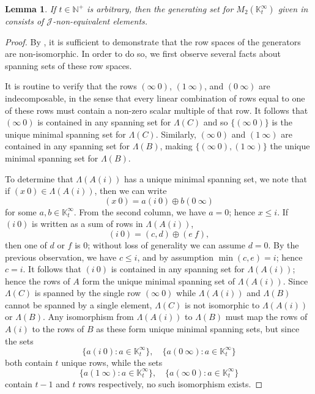 \documentclass[11pt]{article}
\newtheorem{lemma}[thm]{Lemma}
\numberwithin{equation}{section}
\newcommand{\set}[2]{\ensuremath{\{#1 : #2 \}}}
\newcommand{\J}{\mathscr{J}}
\newcommand{\N}{\mathbb{N}}
\newcommand{\Np}{\N^{+}}
\newcommand{\K}{\mathbb{K}}
\newcommand{\Kmint}{\K^{\infty}_t}
\newcommand{\COMMA}{,\quad}
\newcommand{\RowS}{\Lambda}
\begin{document}
\begin{lemma}
  If $t \in \Np$ is arbitrary, then the generating set for $M_2(\Kmint)$ given
  in  consists of
  $\J$-non-equivalent elements.
\end{lemma}
\begin{proof}
  By , it is sufficient to
  demonstrate that the row spaces of the generators are non-isomorphic. In order
  to do so, we first observe several facts about spanning sets of these row
  spaces.

  It is routine to verify that the rows $(\infty~0)$, $(1~\infty)$, and
  $(0~\infty)$ are indecomposable, in the sense that every linear combination of
  rows equal to one of these rows must contain a non-zero scalar multiple of
  that row. It follows that $(\infty~0)$ is contained in any spanning set for
  $\RowS(C)$ and so $\{(\infty~0)\}$ is the unique minimal spanning set for
  $\RowS(C)$.  Similarly, $(\infty~0)$ and $(1~\infty)$ are contained in any
  spanning set for $\RowS(B)$, making $\{(\infty~0), (1~\infty)\}$ the unique
  minimal spanning set for $\RowS(B)$.

  To determine that $\RowS(A(i))$ has a unique minimal spanning set, we note
  that if $(x~0) \in \RowS(A(i))$, then we can write \[(x~0) = a(i~0) \oplus
    b(0~\infty) \] for some $a, b \in \Kmint$. From the second column, we have
  $a = 0$; hence $x \leq i$. If $(i~0)$ is written as a sum of rows in
  $\RowS(A(i))$, \[(i~0) = (c, d) \oplus (e~f),\] then one of $d$ or $f$ is $0$;
  without loss of generality we can assume $d = 0$.  By the previous
  observation, we have $c \leq i$, and by assumption $\min(c, e) = i$; hence $c
  = i$. It follows that $(i~0)$ is contained in any spanning set for
  $\RowS(A(i))$; hence the rows of $A$ form the unique minimal spanning set of
  $\RowS(A(i))$.  Since $\RowS(C)$ is spanned by the single row $(\infty~0)$
  while $\RowS(A(i))$ and $\RowS(B)$ cannot be spanned by a single element,
  $\RowS(C)$ is not isomorphic to $\RowS(A(i))$ or $\RowS(B)$. Any isomorphism
  from $\RowS(A(i))$ to $\RowS(B)$ must map the rows of $A(i)$ to the rows of
  $B$ as these form unique minimal spanning sets, but since the sets
  \[\set{a(i~0)}{a \in \Kmint} \COMMA
    \set{a(0~\infty)}{a \in \Kmint}
  \]
  both contain $t$ unique rows, while the sets 
  \[
    \set{a(1~\infty)}{a \in \Kmint}\COMMA
    \set{a(\infty~0)}{a \in \Kmint}
  \]
  contain $t - 1$ and $t$ rows respectively, no such isomorphism exists.


\end{proof}
\end{document}
